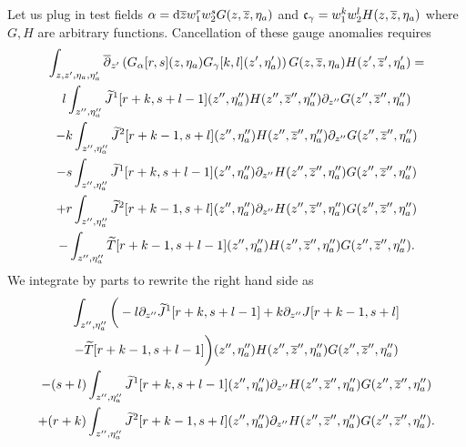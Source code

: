 \documentclass[../main.tex]{subfiles}
\begin{document}
Let us plug in test fields $\alpha = \mathrm{d} {\overline{z}} w_1^r w_2^s G(z,{\overline{z}},\eta_a)$ and $\mathfrak{c}_\gamma = w_1^k w_2^l H(z,{\overline{z}}, \eta_a)$ where $G,H$ are arbitrary functions.  
Cancellation of these gauge anomalies requires
\begin{multline}
\int_{z,z',\eta_a,\eta_a'} \overline{\partial}_{z'} \left(G_\alpha[r,s] (z,\eta_a) G_\gamma[k,l] (z',\eta_a')\right) G(z,{\overline{z}}, \eta_a) H(z',{\overline{z}}',\eta_a') = \\ l \int_{z'',\eta_a''} \widetilde{J}^1[r+k,s+l-1] (z'',\eta_a'') H(z'',{\overline{z}}'', \eta_a'') \partial_{z''} G(z'', {\overline{z}}'', \eta_a'') \\
- k \int_{z'',\eta_a''} \widetilde{J}^2[r+k-1,s+l] (z'',\eta_a'') H(z'',{\overline{z}}'', \eta_a'') \partial_{z''} G(z'', {\overline{z}}'', \eta_a'') \\
-s \int_{z'',\eta_a''} \widetilde{J}^1[r+k,s+l-1] (z'',\eta_a'') \partial_{z''} H(z'',{\overline{z}}'', \eta_a'')  G(z'', {\overline{z}}'', \eta_a'') \\
+ r \int_{z'',\eta_a''} \widetilde{J}^2[r+k-1,s+l] (z'',\eta_a'') \partial_{z''} H(z'',{\overline{z}}'', \eta_a'') G(z'', {\overline{z}}'', \eta_a'') \\
- \int_{z'',\eta_a''} \widetilde{T}[r+k-1,s+l-1] (z'',\eta_a'') H(z'',{\overline{z}}'',\eta_a'') G(z'',{\overline{z}}'', \eta_a'') .
\end{multline}
We integrate by parts to rewrite the right hand side as
\begin{multline}
\int_{z'',\eta_a''} \bigg( -l \partial_{z''} \widetilde{J}^1[r+k,s+l-1] + k \partial_{z''} J[r+k-1,s+l] \\  - \widetilde{T}[r+k-1, s+l-1]\bigg) (z'',\eta_a'') H(z'',{\overline{z}}'', \eta_a'') G(z'', {\overline{z}}'', \eta_a'') \\ - (s+l) \int_{z'',\eta_a''} \widetilde{J}^1[r+k,s+l-1] (z'',\eta_a'') \partial_{z''} H(z'',{\overline{z}}'', \eta_a'') G(z'', {\overline{z}}'', \eta_a'')
\\
+ (r+k) \int_{z'',\eta_a''} \widetilde{J}^2[r+k-1,s+l] (z'',\eta_a'') \partial_{z''} H(z'',{\overline{z}}'', \eta_a'') G(z'', {\overline{z}}'', \eta_a'') .
\end{multline}
\end{document}
